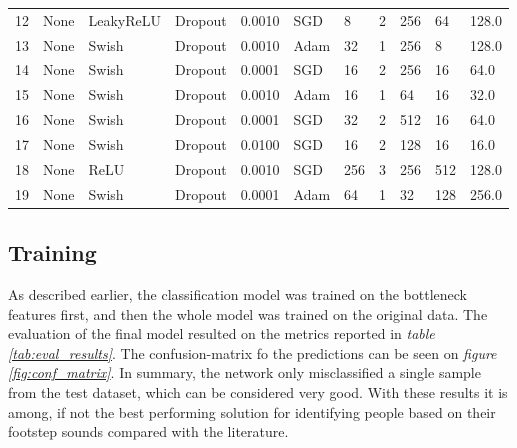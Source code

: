 \documentclass{article}
\begin{document}
\begin{table}
\begin{tabular}{lllllllllll}
    12      & None       & LeakyReLU      & Dropout        & 0.0010         & SGD        & 8           & 2       & 256         & 64          & 128.0  \\
    13      & None       & Swish          & Dropout        & 0.0010         & Adam       & 32          & 1       & 256         & 8           & 128.0  \\
    14      & None       & Swish          & Dropout        & 0.0001         & SGD        & 16          & 2       & 256         & 16          & 64.0   \\
    15      & None       & Swish          & Dropout        & 0.0010         & Adam       & 16          & 1       & 64          & 16          & 32.0   \\
    16      & None       & Swish          & Dropout        & 0.0001         & SGD        & 32          & 2       & 512         & 16          & 64.0   \\
    17      & None       & Swish          & Dropout        & 0.0100         & SGD        & 16          & 2       & 128         & 16          & 16.0   \\
    18      & None       & ReLU           & Dropout        & 0.0010         & SGD        & 256         & 3       & 256         & 512         & 128.0  \\
    19      & None       & Swish          & Dropout        & 0.0001         & Adam       & 64          & 1       & 32          & 128         & 256.0  \\
    \bottomrule
  \end{tabular}
\end{table}

\subsection{Training}

As described earlier, the classification model was trained on the bottleneck features first, and then the whole model was trained on the original data. The evaluation of the final model resulted on the metrics reported in \textit{table \ref{tab:eval_results}}. The confusion-matrix fo the predictions can be seen on \textit{figure \ref{fig:conf_matrix}}. In summary, the network only misclassified a single sample from the test dataset, which can be considered very good. With these results it is among, if not the best performing solution for identifying people based on their footstep sounds compared with the literature.
\end{document}
